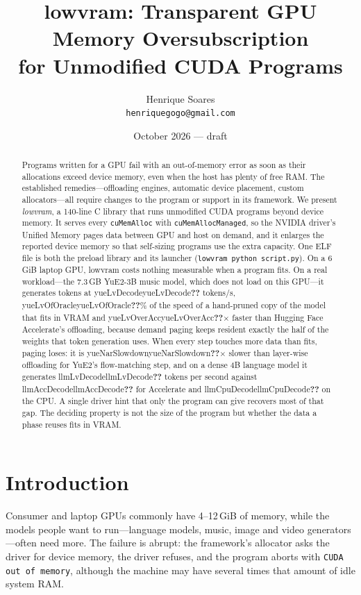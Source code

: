 \documentclass[11pt]{article}
\title{lowvram: Transparent GPU Memory Oversubscription\\for Unmodified CUDA Programs}
\author{Henrique Soares\\\small\texttt{henriquegogo@gmail.com}}
\date{October 2026 --- draft}
\providecommand{\na}{\textbf{??}}
\newcommand{\num}[1]{\ifcsname #1\endcsname\csname #1\endcsname\else\na\fi}
\begin{document}
\maketitle

\begin{abstract}
Programs written for a GPU fail with an out-of-memory error as soon as their allocations exceed
device memory, even when the host has plenty of free RAM. The established remedies---offloading
engines, automatic device placement, custom allocators---all require changes to the program or
support in its framework. We present \emph{lowvram}, a 140-line C library that runs unmodified
CUDA programs beyond device memory. It serves every \texttt{cuMemAlloc} with
\texttt{cuMemAllocManaged}, so the NVIDIA driver's Unified Memory pages data between GPU and host on
demand, and it enlarges the reported device memory so that self-sizing programs use the extra
capacity. One ELF file is both the preload library and its launcher (\texttt{lowvram python
script.py}). On a 6\,GiB laptop GPU, lowvram costs nothing measurable when a program fits. On a real
workload---the 7.3\,GB YuE2-3B music model, which does not load on this GPU---it generates
tokens at \num{yueLvDecode} tokens/s, \num{yueLvOfOracle}\% of the speed of a hand-pruned copy of
the model that fits in VRAM and \num{yueLvOverAcc}$\times$ faster than Hugging Face Accelerate's
offloading, because demand paging keeps resident exactly the half of the weights that token
generation uses. When every step touches more data than fits, paging loses: it is
\num{yueNarSlowdown}$\times$ slower than layer-wise offloading for YuE2's flow-matching step, and on
a dense 4B language model it generates \num{llmLvDecode} tokens per second against
\num{llmAccDecode} for Accelerate and \num{llmCpuDecode} on the CPU. A single driver hint that only
the program can give recovers most of that gap. The deciding property is not the size of the
program but whether the data a phase reuses fits in VRAM.
\end{abstract}

\section{Introduction}

Consumer and laptop GPUs commonly have 4--12\,GiB of memory, while the models people want to
run---language models, music, image and video generators---often need more. The failure is abrupt:
the framework's allocator asks the driver for device memory, the driver refuses, and the program
aborts with \texttt{CUDA out of memory}, although the machine may have several times that amount
of idle system RAM.
\end{document}
